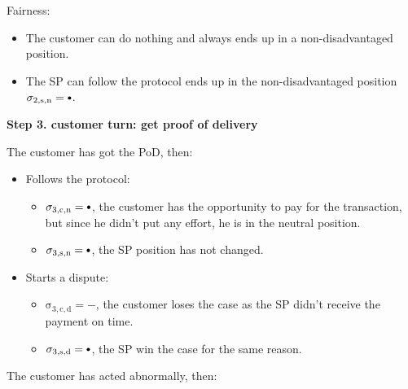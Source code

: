\documentclass{ieeeaccess}
\newcommand\neutral[1][.75]{\mathbin{\ThisStyle{\vcenter{\hbox{%
  \scalebox{#1}{$\SavedStyle\bullet$}}}}}%
}
\begin{document}
Fairness:

\begin{itemize}

\item The customer can do nothing and always ends up in a non-disadvantaged position.
\item The SP can follow the protocol ends up in the non-disadvantaged position \(\operatorname{\sigma_{2, s, n} = \neutral}\).

\end{itemize}

\noindent \textbf
{Step 3. customer turn: get proof of delivery}\label{step-3-get-proof-of-delivery}

The customer has got the PoD, then:

\begin{itemize}
\item
  Follows the protocol:

  \begin{itemize}
  
  \item
    $\operatorname{\sigma_{3, c, n} = \neutral}$, the customer has the opportunity to pay for the transaction, but since he didn't put any effort, he is in the neutral position.
  \item
    $\operatorname{\sigma_{3, s, n} = \neutral}$, the SP position has not changed.
  \end{itemize}
\item
  Starts a dispute:

  \begin{itemize}
  
  \item
    $\operatorname{\sigma_{3, c, d} = -}$, the customer loses the case as the SP didn't receive the payment on time.
  \item
    $\operatorname{\sigma_{3, s, d} = \neutral}$, the SP win the case for the same reason.
  \end{itemize}
\end{itemize}

The customer has acted abnormally, then:
\end{document}
